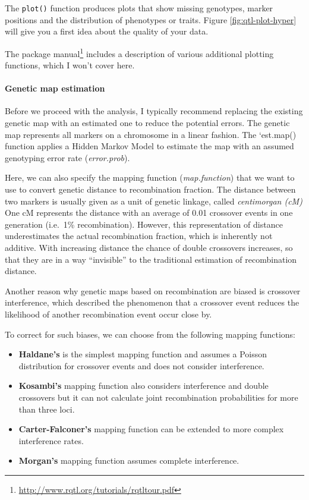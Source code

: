 \documentclass[12pt,]{krantz}
\providecommand{\tightlist}{%
  \setlength{\itemsep}{0pt}\setlength{\parskip}{0pt}}
\let\oldparagraph\paragraph
\renewcommand{\paragraph}[1]{\oldparagraph{#1}\mbox{}}
\renewcommand{\href}[2]{#2\footnote{\url{#1}}}
\theoremstyle{definition}
\theoremstyle{definition}
\theoremstyle{definition}
\theoremstyle{remark}
\begin{document}
The \texttt{plot()} function produces plots that show missing genotypes,
marker positions and the distribution of phenotypes or traits. Figure
\ref{fig:qtl-plot-hyper} will give you a first idea about the quality of
your data.

The \href{http://www.rqtl.org/tutorials/rqtltour.pdf}{package manual}
includes a description of various additional plotting functions, which I
won't cover here.

\paragraph{Genetic map estimation}\label{genetic-map-estimation}

Before we proceed with the analysis, I typically recommend replacing the
existing genetic map with an estimated one to reduce the potential
errors. The genetic map represents all markers on a chromosome in a
linear fashion. The `est.map() function applies a Hidden Markov Model
\citep{Lander01041987} to estimate the map with an assumed genotyping
error rate (\emph{error.prob}).

Here, we can also specify the mapping function (\emph{map.function})
that we want to use to convert genetic distance to recombination
fraction. The distance between two markers is usually given as a unit of
genetic linkage, called \emph{centimorgan (cM)} One cM represents the
distance with an average of 0.01 crossover events in one generation
(i.e.~1\% recombination). However, this representation of distance
underestimates the actual recombination fraction, which is inherently
not additive. With increasing distance the chance of double crossovers
increases, so that they are in a way ``invisible'' to the traditional
estimation of recombination distance.

Another reason why genetic maps based on recombination are biased is
crossover interference, which described the phenomenon that a crossover
event reduces the likelihood of another recombination event occur close
by.

To correct for such biases, we can choose from the following mapping
functions:

\begin{itemize}
\tightlist
\item
  \textbf{Haldane's} is the simplest mapping function and assumes a
  Poisson distribution for crossover events and does not consider
  interference.
\item
  \textbf{Kosambi's} mapping function also considers interference and
  double crossovers but it can not calculate joint recombination
  probabilities for more than three loci.
\item
  \textbf{Carter-Falconer's} mapping function can be extended to more
  complex interference rates.
\item
  \textbf{Morgan's} mapping function assumes complete interference.
\end{itemize}
\end{document}
